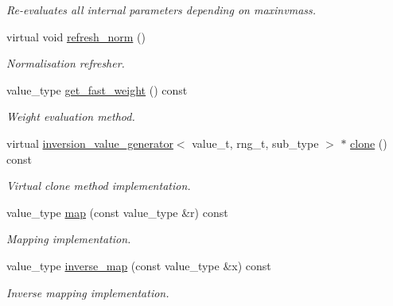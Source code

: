 \begin{DoxyCompactItemize}
\begin{DoxyCompactList}\small\item\em Re-\/evaluates all internal parameters depending on maxinvmass. \end{DoxyCompactList}\item 
\hypertarget{a00321_a101df98ab626ef8c16c6c00427e0167b}{}virtual void \hyperlink{a00321_a101df98ab626ef8c16c6c00427e0167b}{refresh\+\_\+norm} ()\label{a00321_a101df98ab626ef8c16c6c00427e0167b}

\begin{DoxyCompactList}\small\item\em Normalisation refresher. \end{DoxyCompactList}\item 
\hypertarget{a00321_aafe186d1ceebae6572e3eccb0ad89224}{}value\+\_\+type \hyperlink{a00321_aafe186d1ceebae6572e3eccb0ad89224}{get\+\_\+fast\+\_\+weight} () const \label{a00321_aafe186d1ceebae6572e3eccb0ad89224}

\begin{DoxyCompactList}\small\item\em Weight evaluation method. \end{DoxyCompactList}\item 
\hypertarget{a00321_a6737a7af2020fbe006482ba160dbd8b6}{}virtual \hyperlink{a00321}{inversion\+\_\+value\+\_\+generator}$<$ value\+\_\+t, rng\+\_\+t, sub\+\_\+type $>$ $\ast$ \hyperlink{a00321_a6737a7af2020fbe006482ba160dbd8b6}{clone} () const \label{a00321_a6737a7af2020fbe006482ba160dbd8b6}

\begin{DoxyCompactList}\small\item\em Virtual clone method implementation. \end{DoxyCompactList}\item 
\hypertarget{a00321_ae035d1cc8da9941bde0a20fb31d2ecd6}{}value\+\_\+type \hyperlink{a00321_ae035d1cc8da9941bde0a20fb31d2ecd6}{map} (const value\+\_\+type \&r) const \label{a00321_ae035d1cc8da9941bde0a20fb31d2ecd6}

\begin{DoxyCompactList}\small\item\em Mapping implementation. \end{DoxyCompactList}\item 
\hypertarget{a00321_a4b39b986c39f1bef247289f60e34ee78}{}value\+\_\+type \hyperlink{a00321_a4b39b986c39f1bef247289f60e34ee78}{inverse\+\_\+map} (const value\+\_\+type \&x) const \label{a00321_a4b39b986c39f1bef247289f60e34ee78}

\begin{DoxyCompactList}\small\item\em Inverse mapping implementation. \end{DoxyCompactList}\end{DoxyCompactItemize}
